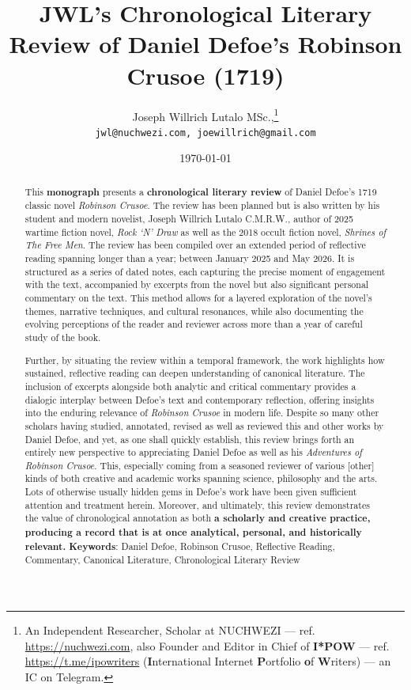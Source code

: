 \documentclass[a4paper]{article}
\title{JWL's Chronological Literary Review of \textbf{Daniel Defoe}'s Robinson Crusoe (1719)}
\author{Joseph Willrich Lutalo MSc.,\thanks{An Independent Researcher, Scholar at NUCHWEZI --- ref. \url{https://nuchwezi.com}, also Founder and Editor in Chief of \textbf{I*POW} --- ref. \url{https://t.me/ipowriters} (\textbf{I}nternational Internet \textbf{P}ortfolio \textbf{o}f \textbf{W}riters) --- an IC on Telegram.}\\
\texttt{jwl@nuchwezi.com, joewillrich@gmail.com}}
\date \today
\begin{document}
\pagestyle{plain} %

%




\pagestyle{fancy} %


\maketitle
\begin{abstract}
This \textbf{monograph} presents a \textbf{chronological literary review} of Daniel Defoe's 1719 classic novel \textit{Robinson Crusoe}. The review has been planned but is also written by his student and modern novelist, Joseph Willrich Lutalo C.M.R.W., author of 2025 wartime fiction novel, \textit{Rock `N' Draw} as well as the 2018 occult fiction novel, \textit{Shrines of The Free Men}. The review has been compiled over an extended period of reflective reading spanning longer than a year; between January 2025 and May 2026. It is structured as a series of dated notes, each capturing the precise moment of engagement with the text, accompanied by excerpts from the novel but also significant personal commentary on the text. This method allows for a layered exploration of the novel's themes, narrative techniques, and cultural resonances, while also documenting the evolving perceptions of the reader and reviewer across more than a year of careful study of the book.  

Further, by situating the review within a temporal framework, the work highlights how sustained, reflective reading can deepen understanding of canonical literature. The inclusion of excerpts alongside both analytic and critical commentary provides a dialogic interplay between Defoe's text and contemporary reflection, offering insights into the enduring relevance of \textit{Robinson Crusoe} in modern life. Despite so many other scholars having studied, annotated, revised as well as reviewed this and other works by Daniel Defoe, and yet, as one shall quickly establish, this review brings forth an entirely new perspective to appreciating Daniel Defoe as well as his \textit{Adventures of Robinson Crusoe}. This, especially coming from a seasoned reviewer of various [other] kinds of both creative and academic works spanning science, philosophy and the arts. Lots of otherwise usually hidden gems in Defoe's work have been given sufficient attention and treatment herein. Moreover, and ultimately, this review demonstrates the value of chronological annotation as both \textbf{a scholarly and creative practice, producing a record that is at once analytical, personal, and historically relevant.}  
 \newline\newline
     \textbf{Keywords}: Daniel Defoe, Robinson Crusoe, Reflective Reading, Commentary, Canonical Literature, Chronological Literary Review
\end{abstract}
\end{document}
